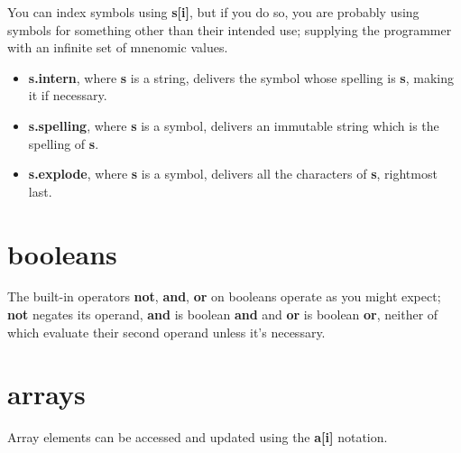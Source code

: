\documentclass{report}
\begin{document}
You can index symbols using {\bf s{[}i{]}}, but if you do so, you are probably
using symbols for something other than their intended use; supplying
the programmer with an infinite set of mnenomic values.

\begin{itemize}\item {\bf s.intern}, where {\bf s} is a string, delivers the symbol whose spelling
is {\bf s}, making it if necessary.

\item {\bf s.spelling}, where {\bf s} is a symbol, delivers an immutable string which
is the spelling of {\bf s}.

\item {\bf s.explode}, where {\bf s} is a symbol, delivers all the characters of {\bf s},
rightmost last.

\end{itemize}

\section{booleans}


The built-in operators {\bf not}, {\bf and}, {\bf or} on booleans operate as you
might expect; {\bf not} negates its operand, {\bf and} is boolean {\bf and} and
{\bf or} is boolean {\bf or}, neither of which evaluate their second operand
unless it's necessary.

\section{arrays}


Array elements can be accessed and updated using the {\bf a{[}i{]}} notation.
\end{document}

